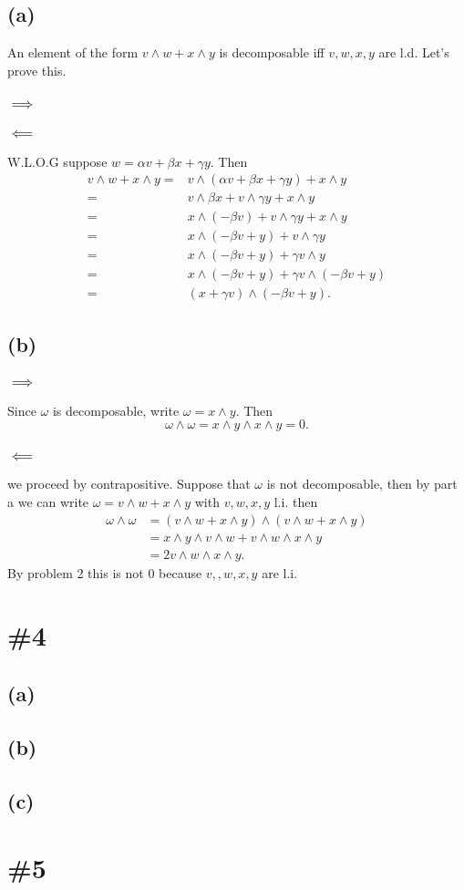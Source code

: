 \documentclass{article}
\begin{document}
\subsection*{(a)}
An element of the form $v\wedge w +x\wedge y$ is decomposable iff $v,w,x,y$ are l.d. Let's prove this.
\subsubsection*{$\implies$}
\subsubsection*{$\impliedby$}
W.L.O.G suppose $w=\alpha v+\beta x+\gamma y$. Then
\begin{align*}
	v\wedge w + x\wedge y =&
	v\wedge(\alpha v + \beta x + \gamma y) + x\wedge y\\
	=& v\wedge\beta x + v\wedge\gamma y + x\wedge y\\
	=& x\wedge(-\beta v) + v\wedge\gamma y + x\wedge y\\
	=& x\wedge(-\beta v+y) + v\wedge\gamma y \\
	=& x\wedge(-\beta v+y) + \gamma v\wedge y \\
	=& x\wedge(-\beta v+y) + \gamma v\wedge(-\beta v + y) \\
	=& (x+\gamma v)\wedge(-\beta v+y).
\end{align*}

\subsection*{(b)}
\subsubsection*{$\implies$}
Since $\omega$ is decomposable, write $\omega=x\wedge y$. Then
\[
	\omega\wedge\omega=x\wedge y\wedge x\wedge y=0.
\]
\subsubsection*{$\impliedby$}
we proceed by contrapositive. Suppose that $\omega$ is not decomposable, then
by part a we can write $\omega=v\wedge w+x\wedge y$ with $v,w,x,y$ l.i. then
\begin{align*}
	\omega\wedge\omega&=\left(v\wedge w+x\wedge y\right)\wedge \left(v\wedge w+x\wedge y\right)\\
	&=x\wedge y \wedge v \wedge w + v \wedge w \wedge x\wedge y\\
	&=2v \wedge w \wedge x\wedge y.
\end{align*}
By problem 2 this is not 0 because $v,,w,x,y$ are l.i.

\section*{\#4}
\subsection*{(a)}
\subsection*{(b)}
\subsection*{(c)}
\section*{\#5}
\end{document}

